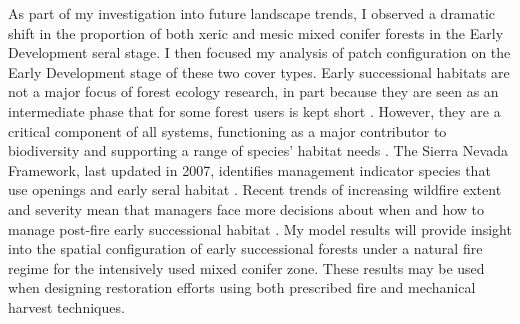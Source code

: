 As part of my investigation into future landscape trends, I observed a dramatic shift in the proportion of both xeric and mesic mixed conifer forests in the Early Development seral stage. I then focused my analysis of patch configuration on the Early Development stage of these two cover types. Early successional habitats are not a major focus of forest ecology research, in part because they are seen as an intermediate phase that for some forest users is kept short \citep{Swanson2011}. However, they are a critical component of all systems, functioning as a major contributor to biodiversity and supporting a range of species' habitat needs \citep{Chang1995,Hutto2008,Swanson2011}. The Sierra Nevada Framework, last updated in 2007, identifies management indicator species that use openings and early seral habitat \citep{USDAForestService2004,USDAForestService2007}. Recent trends of increasing wildfire extent and severity mean that managers face more decisions about when and how to manage post-fire early successional habitat \citep{Stephens2013,Dellasala2014}. My model results will provide insight into the spatial configuration of early successional forests under a natural fire regime for the intensively used mixed conifer zone. These results may be used when designing restoration efforts using both prescribed fire and mechanical harvest techniques.





